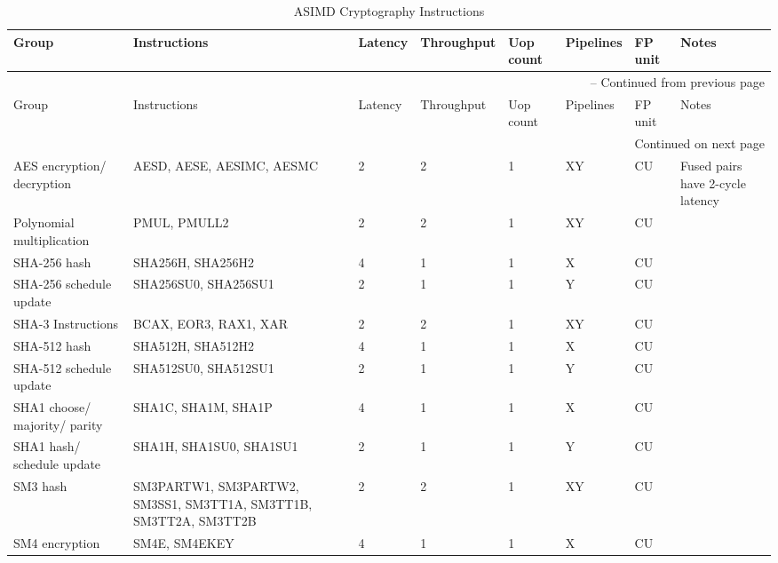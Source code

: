 \newpage
\begin{longtable}{|p{1in}|p{1in}|l|l|l|p{1in}|l|p{1in}|}
\caption{ASIMD Cryptography Instructions} \\
\hline
Group & Instructions & Latency & Throughput & Uop count & Pipelines & FP unit & Notes\\
\hline
\endfirsthead
\hline
\multicolumn{8}{|r|}{{\tablename\ \thetable{} -- Continued from previous page}} \\
\hline
Group & Instructions & Latency & Throughput & Uop count & Pipelines & FP unit & Notes\\
\hline
\endhead
\hline
\multicolumn{8}{|r|}{{Continued on next page}} \\
\hline
\endfoot
\hline
\endlastfoot
AES encryption/ decryption & AESD, AESE, AESIMC, AESMC & 2 & 2 & 1 & XY & CU & Fused pairs have 2-cycle latency\\
\hline
Polynomial multiplication & PMUL, PMULL{{2}} & 2 & 2 & 1 & XY & CU & \\
\hline
SHA-256 hash & SHA256H, SHA256H2 & 4 & 1 & 1 & X & CU & \\
\hline
SHA-256 schedule update & SHA256SU0, SHA256SU1 & 2 & 1 & 1 & Y & CU & \\
\hline
SHA-3 Instructions & BCAX, EOR3, RAX1, XAR & 2 & 2 & 1 & XY & CU & \\
\hline
SHA-512 hash & SHA512H, SHA512H2 & 4 & 1 & 1 & X & CU & \\
\hline
SHA-512 schedule update & SHA512SU0, SHA512SU1 & 2 & 1 & 1 & Y & CU & \\
\hline
SHA1 choose/ majority/ parity & SHA1C, SHA1M, SHA1P & 4 & 1 & 1 & X & CU & \\
\hline
SHA1 hash/ schedule update & SHA1H, SHA1SU0, SHA1SU1 & 2 & 1 & 1 & Y & CU & \\
\hline
SM3 hash & SM3PARTW1, SM3PARTW2, SM3SS1, SM3TT1A, SM3TT1B, SM3TT2A, SM3TT2B & 2 & 2 & 1 & XY & CU & \\
\hline
SM4 encryption & SM4E, SM4EKEY & 4 & 1 & 1 & X & CU & \\
\hline
\end{longtable}
\newpage
